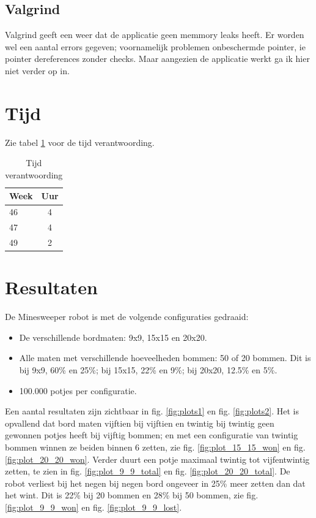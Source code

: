 \documentclass[10pt]{article}
\begin{document}
\subsection{Valgrind}
Valgrind geeft een weer dat de applicatie geen memmory leaks heeft. Er worden wel een aantal errors gegeven;
voornamelijk problemen onbeschermde pointer, ie pointer dereferences zonder checks. Maar aangezien de applicatie werkt
ga ik hier niet verder op in.

\section{Tijd}
Zie tabel \ref{tab:time} voor de tijd verantwoording.

\begin{table}[H]
  \begin{center}
    \begin{tabular}{ l c }
      Week & Uur \\ \hline
      46   & 4   \\
      47   & 4   \\
      49   & 2   \\
    \end{tabular}

    \caption{Tijd verantwoording}
    \label{tab:time}
  \end{center}
\end{table}

\section{Resultaten}
\label{sec:stat}
De Minesweeper robot is met de volgende configuraties gedraaid:
\begin{itemize}
  \item De verschillende bordmaten: 9x9, 15x15 en 20x20.
  \item Alle maten met verschillende hoeveelheden bommen: 50 of 20 bommen. Dit is bij 9x9,
        60\% en 25\%; bij 15x15, 22\% en 9\%; bij 20x20, 12.5\% en 5\%.
  \item 100.000 potjes per configuratie.
\end{itemize}

Een aantal resultaten zijn zichtbaar in fig. \ref{fig:plots1} en fig. \ref{fig:plots2}. Het is opvallend dat bord maten
vijftien bij vijftien en
twintig bij twintig geen
gewonnen potjes heeft bij vijftig bommen; en met een configuratie van twintig bommen winnen ze beiden binnen 6 zetten,
zie
fig. \ref{fig:plot_15_15_won} en fig. \ref{fig:plot_20_20_won}. Verder duurt een potje maximaal twintig tot
vijfentwintig zetten, te
zien in fig. \ref{fig:plot_9_9_total} en fig. \ref{fig:plot_20_20_total}. De robot verliest bij het negen bij negen
bord ongeveer in 25\%  meer
zetten dan dat het wint. Dit is 22\% bij 20 bommen en 28\% bij 50 bommen, zie fig. \ref{fig:plot_9_9_won} en fig.
\ref{fig:plot_9_9_lost}.
\end{document}
